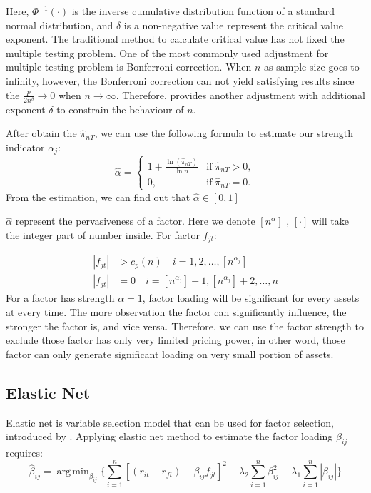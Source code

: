 \documentclass[12pt]{article}
\DeclareMathOperator*{\argmin}{arg\,min}
\begin{document}
Here, $\Phi^{-1}(\cdot)$ is the inverse cumulative distribution function of a standard normal distribution, and $\delta$ is a non-negative value represent the critical value exponent. 
The traditional method to calculate critical value has not fixed the multiple testing problem. 
One of the most commonly used adjustment for multiple testing problem is Bonferroni correction. 
When $n$ as sample size goes to infinity, however, the Bonferroni correction can not yield satisfying results since the $\frac{p}{2n^{\delta}} \to 0$ when $n \to \infty$. 
Therefore,  provides another adjustment with additional exponent $\delta$ to constrain the behaviour of $n$.

After obtain the $\hat{\pi}_{nT}$, we can use the following formula to estimate our strength indicator $\alpha_j$:
\[ \hat{\alpha} = \begin{cases}
1+\frac{\ln(\hat{\pi}_{nT})}{\ln n} & \text{if}\; \hat{\pi}_{nT} > 0,\\
0, & \text{if}\; \hat{\pi}_{nT} = 0.
\end{cases} \]
From the estimation, we can find out that $\hat{\alpha} \in [0,1]$

$\hat{\alpha}$ represent the pervasiveness of a factor. 
Here we denote $[n^{\alpha}]$ , $[\cdot]$ will take the integer part of number inside. 
For factor $f_{jt}$:

\begin{align*}
|f_{jt}| &> c_p(n)\quad i = 1, 2,  \dots, [n^{\alpha_j}]\\
|f_{jt}| &= 0 \quad i = [n^{\alpha_j}] + 1, [n^{\alpha_j}] +2 ,\dots, n
\end{align*}
For a factor has strength $\alpha = 1$,  factor loading will be significant for every assets at every time. 
The more observation the factor can significantly influence, the stronger the factor is, and vice versa.
Therefore, we can use the factor strength to exclude those factor has only very limited pricing power, in other word, those factor can only generate significant loading on very small portion of assets. 

\subsection{Elastic Net}

Elastic net  is variable selection model that can be used for factor selection, introduced by . Applying elastic net method to estimate the factor loading $\beta_{ij}$ requires:
	\[   \hat{\beta}_{ij}  = \argmin_{\beta_{ij}}\{\sum_{i = 1}^{n}[(r_{it} - r_{ft}) - \beta_{ij }f_{jt}]^2 + \lambda_2\sum_{i = 1}^{n}\beta_{ij}^2  + \lambda_1\sum_{i = 1}^{n}|\beta_{ij}|  \label{ENcriterion} \tag{4}   \}    \]
	
\end{document}
